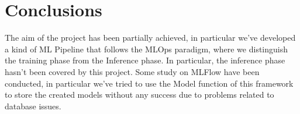 \documentclass[sigconf]{acmart}
\begin{document}
\section{Conclusions}
The aim of the project has been partially achieved, in particular we've developed a kind of ML Pipeline that follows the MLOps paradigm, where we distinguish the training phase from the Inference phase. In particular, the inference phase hasn't been covered by this project. Some study on MLFlow have been conducted, in particular we've tried to use the Model function of this framework to store the created models without any success due to problems related to database issues.


    
    
\end{document}
